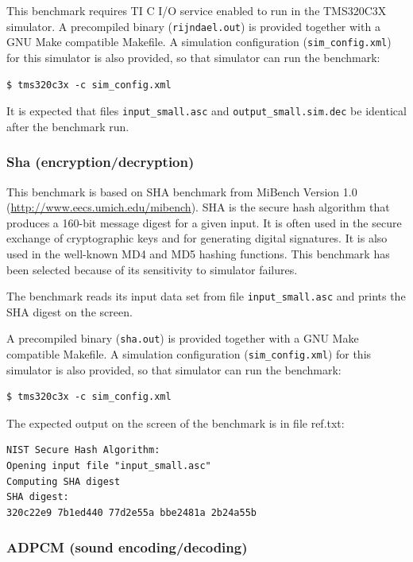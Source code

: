 This benchmark requires TI C I/O service enabled to run in the TMS320C3X simulator.
A precompiled binary (\texttt{rijndael.out}) is provided together with a GNU Make compatible Makefile.
A simulation configuration (\texttt{sim\_config.xml}) for this simulator is also provided, so that simulator can run the benchmark:

\begin{verbatim}
$ tms320c3x -c sim_config.xml
\end{verbatim}

It is expected that files \texttt{input\_small.asc} and \texttt{output\_small.sim.dec} be identical after the benchmark run.

\subsubsection{Sha (encryption/decryption)}

This benchmark is based on SHA benchmark from MiBench Version 1.0 (\url{http://www.eecs.umich.edu/mibench}).
SHA is the secure hash algorithm that produces a 160-bit message digest for a given input. It is often
used in the secure exchange of cryptographic keys and for generating digital signatures. It is also used in the
well-known MD4 and MD5 hashing functions.
This benchmark has been selected because of its sensitivity to simulator failures.

The benchmark reads its input data set from file \texttt{input\_small.asc} and prints the SHA digest on the screen.

A precompiled binary (\texttt{sha.out}) is provided together with a GNU Make compatible Makefile.
A simulation configuration (\texttt{sim\_config.xml}) for this simulator is also provided, so that simulator can run the benchmark:

\begin{verbatim}
$ tms320c3x -c sim_config.xml
\end{verbatim}

The expected output on the screen of the benchmark is in file ref.txt:

\begin{verbatim}
NIST Secure Hash Algorithm:
Opening input file "input_small.asc"
Computing SHA digest
SHA digest:
320c22e9 7b1ed440 77d2e55a bbe2481a 2b24a55b
\end{verbatim}

\subsubsection{ADPCM (sound encoding/decoding)}

